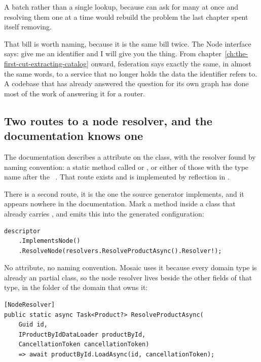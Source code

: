 A batch rather than a single lookup, because  can ask for many
at once and resolving them one at a time would rebuild the problem the last
chapter spent itself removing.

That bill is worth naming, because it is the same bill twice. The Node interface
says: give me an identifier and I will give you the thing. From
chapter~\ref{ch:the-first-cut-extracting-catalog} onward, federation says
exactly the same, in almost the same words, to a service that no longer holds
the data the identifier refers to. A codebase that has already answered the
question for its own graph has done most of the work of answering it for a
router.

\subsection*{Two routes to a node resolver, and the documentation knows one}

%
The documentation describes a \code{[Node]} attribute on the class, with the
resolver found by naming convention: a static method called  or
, or either of those with the type name after the
~\autocite{chillicream2026relay}. That route exists and is
implemented by reflection in .

There is a second route, it is the one the source generator implements, and it
appears nowhere in the documentation. Mark a method \code{[NodeResolver]}
inside a class that already carries \code{[ObjectType<T>]}, and
 emits this into the generated configuration:

\begin{verbatim}
descriptor
    .ImplementsNode()
    .ResolveNode(resolvers.ResolveProductAsync().Resolver!);
\end{verbatim}

No \code{[Node]} attribute, no naming convention. Mosaic uses it because every
domain type is already an \code{[ObjectType<T>]} partial class, so the node
resolver lives beside the other fields of that type, in the folder of the domain
that owns it:

\begin{verbatim}
[NodeResolver]
public static async Task<Product?> ResolveProductAsync(
    Guid id,
    IProductByIdDataLoader productById,
    CancellationToken cancellationToken)
    => await productById.LoadAsync(id, cancellationToken);
\end{verbatim}

